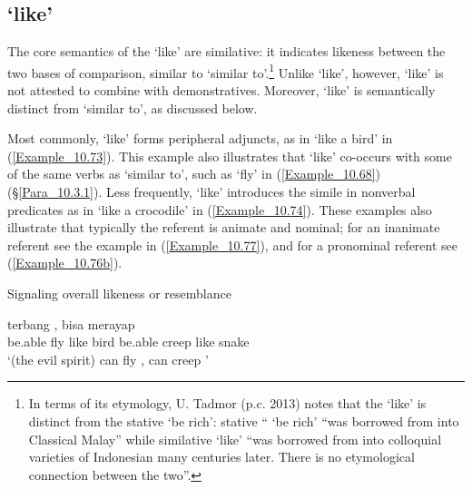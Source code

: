 \subsection{ ‘like’}
\label{Para_10.3.2}
The core semantics of the   ‘like’ are similative: it indicates likeness between the two bases of comparison, similar to  ‘similar to’.\footnote{In terms of its etymology, U. Tadmor (p.c. 2013) notes that the   ‘like’ is distinct from the stative   ‘be rich’: stative “ ‘be rich’ “was borrowed from  into Classical Malay” while similative  ‘like’ “was borrowed from  into colloquial varieties of Indonesian many centuries later. There is no etymological connection between the two”.}
Unlike  ‘like’, however,  ‘like’ is not attested to combine with demonstratives. Moreover,  ‘like’ is semantically distinct from  ‘similar to’, as discussed below.



Most commonly,  ‘like’ forms peripheral adjuncts, as in  ‘like a bird’ in (\ref{Example_10.73}). This example also illustrates that  ‘like’ co-occurs with some of the same verbs as  ‘similar to’, such as  ‘fly’ in (\ref{Example_10.68}) (§\ref{Para_10.3.1}). Less frequently,  ‘like’ introduces the simile in nonverbal predicates as in  ‘like a crocodile’ in (\ref{Example_10.74}). These examples also illustrate that typically the referent is animate and nominal; for an inanimate referent see the example in (\ref{Example_10.77}), and for a pronominal referent see (\ref{Example_10.76b}).


\begin{styleExampleTitle}
Signaling overall likeness or resemblance
\end{styleExampleTitle}

\ea
\label{Example_10.73}
 {terbang} {} {,} {bisa} {merayap} {} {}\\ %
 be.able  fly  like  bird  be.able  creep  like  snake\\
\glt 
‘(the evil spirit) can fly , can creep ’ \textstyleExampleSource{[081006-022-CvEx.0031]}
\z

